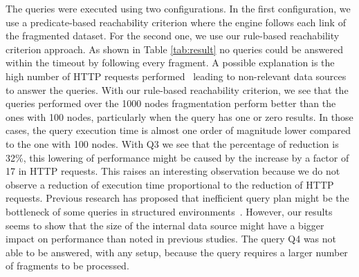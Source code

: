 The queries were executed using two configurations.
In the first configuration, we use a predicate-based reachability criterion where the engine follows each link of the fragmented dataset.
For the second one, we use our rule-based reachability criterion approach.
As shown in Table \ref{tab:result} no queries could be answered within the timeout by following every fragment.
A possible explanation is the high number of HTTP requests performed~\cite{Hartig2016} leading to non-relevant data sources to answer the queries.
With our rule-based reachability criterion, we see that the queries performed over the 1000 nodes fragmentation perform better than the ones with 100 nodes, particularly when the query has one or zero results.
In those cases, the query execution time is almost one order of magnitude lower compared to the one with 100 nodes.
With Q3 we see that the percentage of reduction is 32\%, this lowering of performance might be caused by the increase by a factor of 17 in HTTP requests.
This raises an interesting observation because we do not observe a reduction of execution time proportional to the reduction of HTTP requests.
Previous research has proposed that inefficient query plan might be the bottleneck of some queries in structured environments~\cite{taelman2023,eschauzier_quweda_2023}.
However, our results seems to show that the size of the internal data source might have a bigger impact on performance than noted in previous studies.
The query Q4 was not able to be answered, with any setup, because the query requires a larger number of fragments to be processed.
